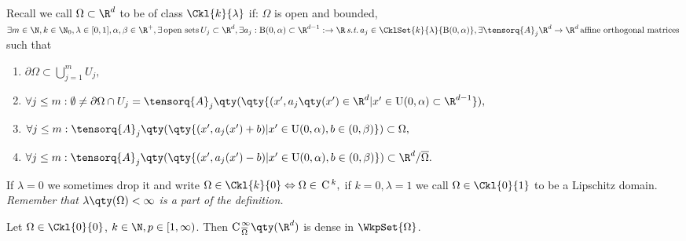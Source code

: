 \begin{remark}
	Recall we call $\Omega \subset \R^{d}$ to be of class $\Ckl{k}{\lambda}$ if: $\Omega$ is open and bounded, $\exists m \in \N, k \in \N_0, \lambda \in [0,1], \alpha, \beta \in \R^+, \exists \, \text{open sets} \, U_j \subset \R^d, \exists a_j: \text{B}(0,\alpha) \subset \R^{d-1}: \to \R \, \text{\textit{s.t.}} \, a_j \in \CklSet{k}{\lambda}{\text{B}(0,\alpha)}, \exists \tensorq{A}_j \R^{d} \to \R^{d} \, \text{affine orthogonal matrices} \,$ such that 
	\begin{enumerate}
		\item $\partial \Omega \subset \bigcup_{j=1}^m U_j,$
		\item $\forall j \leq m: \emptyset \neq \partial \Omega \cap U_j = \tensorq{A}_j\qty(\qty{(x',a_j\qty(x') \in \R^d | x' \in \text{U}(0,\alpha)\subset \R^{d-1}}),$
		\item $\forall j \leq m: \tensorq{A}_j\qty(\qty{(x', a_j(x') + b) | x' \in \text{U}(0,\alpha), b \in (0,\beta)}) \subset \Omega,$
		\item $\forall j \leq m: \tensorq{A}_j\qty(\qty{(x', a_j(x') - b) | x' \in \text{U}(0,\alpha), b \in (0,\beta)}) \subset \R^d/ \overline{\Omega}.$
\end{enumerate}
	If $\lambda = 0$ we sometimes drop it and write $\Omega \in \Ckl{k}{0} \Leftrightarrow \Omega \in \, \text{C} \,^k,$ if $k = 0, \lambda =1$ we call $\Omega \in \Ckl{0}{1}$ to be a Lipschitz domain.
\textit{Remember that $\lambda\qty(\Omega)<\infty$ is a part of the definition.}

\end{remark}

\begin{theorem}
	Let $\Omega \in \Ckl{0}{0}$, $k \in \N, p \in [1,\infty)$. Then $\text{C}^{\,\infty}_{\,\overline{\Omega}}\qty(\R^d)$ is dense in $\WkpSet{\Omega}$.


\end{theorem}

